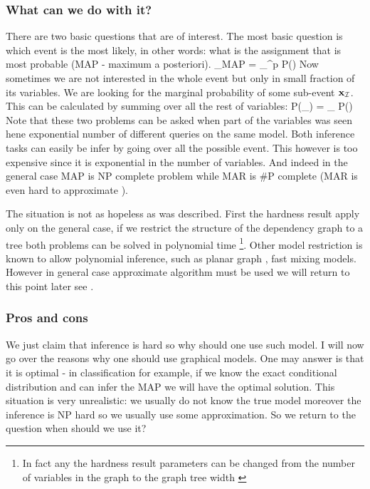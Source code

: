 \subsubsection{What can we do with it?}
There are two basic questions that are of interest.
The most basic question is which event is the most likely, in other words: what is the assignment that is most probable (MAP - maximum a posteriori).
\be
\label{eq:MAP}
\xx_{MAP} = \arg \max_{\xx \in \cX^p} P(\xx) 
\ee
Now sometimes we are not interested in the whole event but only in small fraction of its variables.
We are looking for the marginal probability of some sub-event ${\bf x}_{{\cal I}}$.
This can be calculated by summing over all the rest of variables:
\be
\label{eq:MAR}
P(\xx_{\cI}) = \sum_{} P(\zz)
\ee
Note that these two problems can be asked when part of the variables was seen hene exponential number of different queries on the same model. 
Both inference tasks can easily be infer by going over all the possible event.
This however is too expensive since it is exponential in the number of variables.
And indeed in the general case MAP\cite{shimony1994finding} is NP complete problem while MAR\cite{cooper1990computational} is \#P complete (MAR is even hard to approximate \cite{roth1996hardness}).

The situation is not as hopeless as was described.
First the hardness result apply only on the general case, if we restrict the structure of the dependency graph to a tree both problems can be solved in polynomial time \footnote{In fact any the hardness result parameters can be changed from the number of variables in the graph to the graph tree width \cite{robertson1983graph,robertson1994quickly} }.
Other model restriction is known to allow polynomial inference, such as planar graph \cite{jaakkola2007approximate}, fast mixing models\cite{jerrum1993polynomial}.
However in general case approximate algorithm must be used we will return to this point later see . 
\subsubsection{Pros and cons}
We just claim that inference is hard so why should one use such model.
I will now go over the reasons why one should use graphical models.
One may answer is that it is optimal - in classification for example, if we know the exact conditional distribution and can infer the MAP we will have the optimal solution. This situation is very unrealistic: we usually do not know the true model moreover the inference is NP hard so we usually use some approximation. So we return to the question when should we use it?

